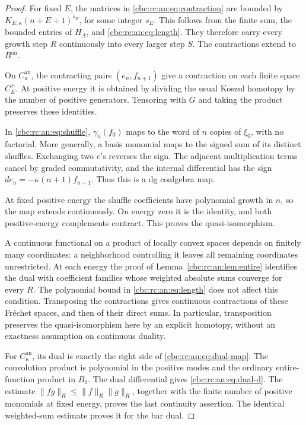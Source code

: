 \begin{proof}
For fixed \(E\), the matrices in \eqref{cbc:rc:an:eq:contraction} are
bounded by \(K_{E,\kappa}(n+E+1)^{s_E}\), for some integer \(s_E\).
This follows from the finite sum, the bounded entries of \(H_A\),
and \eqref{cbc:rc:an:eq:length}. They therefore carry every growth step
\(R\) continuously into every larger step \(S\). The contractions
extend to \(B^{\mathrm{an}}\).

On \(C^{\mathrm{an}}_\kappa\), the
contracting pairs \((e_n,f_{n+1})\) give a contraction on each finite
space \(C^+_E\). At positive energy it is obtained by dividing the
usual Koszul homotopy by the number of positive generators. Tensoring
with \(G\) and taking the product preserves these identities.

In \eqref{cbc:rc:an:eq:shuffle}, \(\gamma_n(f_0)\) maps to the word of
\(n\) copies of \(\xi_0\), with no factorial. More generally, a
basis monomial maps to the signed sum of its distinct shuffles.
Exchanging two \(e\)'s reverses the sign. The adjacent multiplication
terms cancel by graded commutativity, and the internal differential
has the sign \(de_n=-\kappa(n+1)f_{n+1}\). Thus this is a dg
coalgebra map.

At fixed positive energy the shuffle coefficients have
polynomial growth in \(n\), so the map extends continuously. On energy
zero it is the identity, and both positive-energy complements contract.
This proves the quasi-isomorphism.

A continuous functional on a product of locally convex spaces depends
on finitely many coordinates: a neighborhood controlling it leaves
all remaining coordinates unrestricted. At each energy the proof of
Lemma~\ref{cbc:rc:an:lem:entire} identifies the dual with coefficient
families whose weighted absolute sums converge for every \(R\).
The polynomial bound in \eqref{cbc:rc:an:eq:length} does not affect this
condition. Transposing the contractions gives continuous contractions
of these Fr\'echet spaces, and then of their direct sums. In particular,
transposition preserves the quasi-isomorphism here by an explicit
homotopy, without an exactness assumption on continuous duality.

For \(C^{\mathrm{an}}_\kappa\), its dual is exactly the right side
of \eqref{cbc:rc:an:eq:dual-map}. The convolution product is polynomial in
the positive modes and the ordinary entire-function product in
\(B_0\). The dual differential gives \eqref{cbc:rc:an:eq:dual-d}.
The estimate \(\|fg\|_R\leq\|f\|_R\|g\|_R\), together with the
finite number of positive monomials at fixed energy, proves the last
continuity assertion. The identical weighted-sum estimate proves it
for the bar dual.
\end{proof}

